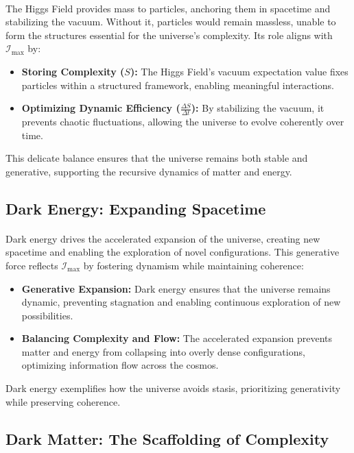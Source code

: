 \documentclass[12pt]{article}
\begin{document}
\paragraph{}
The Higgs Field provides mass to particles, anchoring them in spacetime and stabilizing the vacuum. Without it, particles would remain massless, unable to form the structures essential for the universe’s complexity. Its role aligns with \(\mathcal{I}_{\text{max}}\) by:
\begin{itemize}
    \item \textbf{Storing Complexity (\(S\)):} The Higgs Field’s vacuum expectation value fixes particles within a structured framework, enabling meaningful interactions.
    \item \textbf{Optimizing Dynamic Efficiency (\(\frac{\Delta S}{\Delta t}\)):} By stabilizing the vacuum, it prevents chaotic fluctuations, allowing the universe to evolve coherently over time.
\end{itemize}
This delicate balance ensures that the universe remains both stable and generative, supporting the recursive dynamics of matter and energy.

\subsection{Dark Energy: Expanding Spacetime}
\paragraph{}
Dark energy drives the accelerated expansion of the universe, creating new spacetime and enabling the exploration of novel configurations. This generative force reflects \(\mathcal{I}_{\text{max}}\) by fostering dynamism while maintaining coherence:
\begin{itemize}
    \item \textbf{Generative Expansion:} Dark energy ensures that the universe remains dynamic, preventing stagnation and enabling continuous exploration of new possibilities.
    \item \textbf{Balancing Complexity and Flow:} The accelerated expansion prevents matter and energy from collapsing into overly dense configurations, optimizing information flow across the cosmos.
\end{itemize}
Dark energy exemplifies how the universe avoids stasis, prioritizing generativity while preserving coherence.

\subsection{Dark Matter: The Scaffolding of Complexity}
\end{document}
